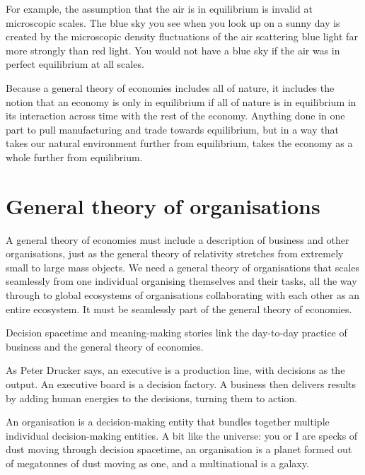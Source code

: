 For example, the assumption that the air is in equilibrium is invalid at microscopic scales. The blue sky you see when you look up on a sunny day is created by the microscopic density fluctuations of the air scattering blue light far more strongly than red light. You would not have a blue sky if the air was in perfect equilibrium at all scales.


Because a general theory of economies includes all of nature, it includes the notion that an economy is only in equilibrium if all of nature is in equilibrium in its interaction across time with the rest of the economy. Anything done in one part to pull manufacturing and trade towards equilibrium, but in a way that takes our natural environment further from equilibrium, takes the economy as a whole further from equilibrium. 
\section*{General theory of organisations}
\label{section:general-theory-organisations}


A general theory of economies must include a description of business and other organisations, just as the general theory of relativity  stretches from extremely small to large mass objects. We need a general theory of organisations that scales seamlessly from one individual organising themselves and their tasks, all the way through to global ecosystems of organisations collaborating with each other as an entire ecosystem. It must be seamlessly part of the general theory of economies.


Decision spacetime and meaning\hyp{}making stories link the day\hyp{}to\hyp{}day practice of business and the general theory of economies.


As Peter Drucker  says, an executive is a production line, with decisions as the output. An executive board is a decision factory. A business then delivers results by adding human energies to the decisions, turning them to action.


An organisation is a decision\hyp{}making entity that bundles together multiple individual decision\hyp{}making entities. A bit like the universe:  you or I are specks of dust moving through decision spacetime, an organisation is a planet formed out of megatonnes of dust moving as one, and a multinational is a galaxy.


